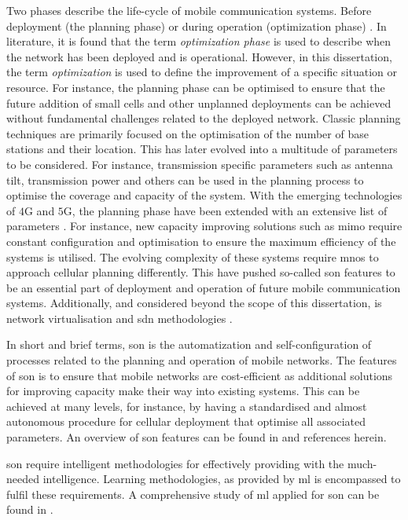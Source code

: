 Two phases describe the life-cycle of mobile communication systems. Before deployment (the planning phase) or during operation (optimization phase) \cite{Taufique2017}. In literature, it is found that the term \emph{optimization phase} is used to describe when the network has been deployed and is operational. However, in this dissertation, the term \emph{optimization} is used to define the improvement of a specific situation or resource. For instance, the planning phase can be optimised to ensure that the future addition of small cells and other unplanned deployments can be achieved without fundamental challenges related to the deployed network. Classic planning techniques are primarily focused on the optimisation of the number of base stations and their location. This has later evolved into a multitude of parameters to be considered. For instance, transmission specific parameters such as antenna tilt, transmission power and others can be used in the planning process to optimise the coverage and capacity of the system. With the emerging technologies of $4$G and $5$G, the planning phase have been extended with an extensive list of parameters  \cite{Taufique2017}. For instance, new capacity improving solutions such as \gls{mimo} require constant configuration and optimisation to ensure the maximum efficiency of the systems is utilised. The evolving complexity of these systems require \glspl{mno} to approach cellular planning differently. This have pushed so-called \gls{son} features to be an essential part of deployment and operation of future mobile communication systems. Additionally, and considered beyond the scope of this dissertation, is network virtualisation and \gls{sdn} methodologies  \cite{Taufique2017}.


In short and brief terms, \gls{son} is the automatization and self-configuration of processes related to the planning and operation of mobile networks. The features of \gls{son} is to ensure that mobile networks are cost-efficient as additional solutions for improving capacity make their way into existing systems. This can be achieved at many levels, for instance, by having a standardised and almost autonomous procedure for cellular deployment that optimise all associated parameters. An overview of \gls{son} features can be found in \cite{Jorguseski2014Self-organizingTrends} and references herein.

\acrlong{son} require intelligent methodologies for effectively providing with the much-needed intelligence. Learning methodologies, as provided by \acrfull{ml} is encompassed to fulfil these requirements. A comprehensive study of \gls{ml} applied for \gls{son} can be found in \cite{Klaine2017ANetworks}. 

